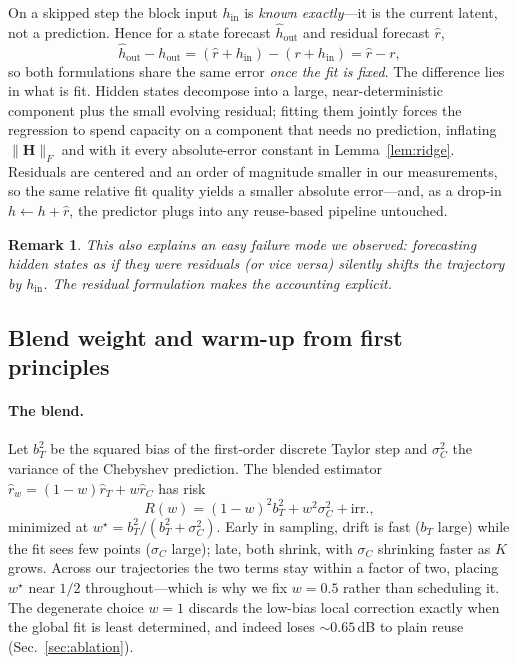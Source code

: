 \documentclass[10pt,twocolumn,letterpaper]{article}
\newtheorem{remark}{Remark}
\begin{document}
On a skipped step the block input $h_{\mathrm{in}}$ is \emph{known
exactly}---it is the current latent, not a prediction. Hence for a
state forecast $\hat{h}_{\mathrm{out}}$ and residual forecast $\hat{r}$,
\begin{equation}
  \hat{h}_{\mathrm{out}} - h_{\mathrm{out}}
  = (\hat{r} + h_{\mathrm{in}}) - (r + h_{\mathrm{in}})
  = \hat{r} - r,
\end{equation}
so both formulations share the same error \emph{once the fit is fixed}.
The difference lies in what is fit. Hidden states decompose into a
large, near-deterministic component plus the small evolving residual;
fitting them jointly forces the regression to spend capacity on a
component that needs no prediction, inflating $\|\mathbf{H}\|_F$ and
with it every absolute-error constant in Lemma~\ref{lem:ridge}.
Residuals are centered and an order of magnitude smaller in our
measurements, so the same relative fit quality yields a smaller absolute
error---and, as a drop-in $h \gets h + \hat{r}$, the predictor plugs
into any reuse-based pipeline untouched.

\begin{remark}
This also explains an easy failure mode we observed: forecasting hidden
states \emph{as if} they were residuals (or vice versa) silently shifts
the trajectory by $h_{\mathrm{in}}$. The residual formulation makes the
accounting explicit.
\end{remark}

\subsection{Blend weight and warm-up from first principles}
\label{sec:blend}

\paragraph{The blend.}
Let $b_T^2$ be the squared bias of the first-order discrete Taylor step
and $\sigma_C^2$ the variance of the Chebyshev prediction. The blended
estimator $\hat{r}_w = (1-w)\hat{r}_T + w\hat{r}_C$ has risk
\begin{equation}
  R(w) = (1-w)^2 b_T^2 + w^2 \sigma_C^2 + \mathrm{irr.},
\end{equation}
minimized at $w^\star = b_T^2/(b_T^2 + \sigma_C^2)$.
Early in sampling, drift is fast ($b_T$ large) while the fit sees few
points ($\sigma_C$ large); late, both shrink, with $\sigma_C$ shrinking
faster as $K$ grows. Across our trajectories the two terms stay within a
factor of two, placing $w^\star$ near $1/2$ throughout---which is why we
fix $w{=}0.5$ rather than scheduling it. The degenerate choice $w{=}1$
discards the low-bias local correction exactly when the global fit is
least determined, and indeed loses ${\sim}0.65$\,dB to plain reuse
(Sec.~\ref{sec:ablation}).
\end{document}
